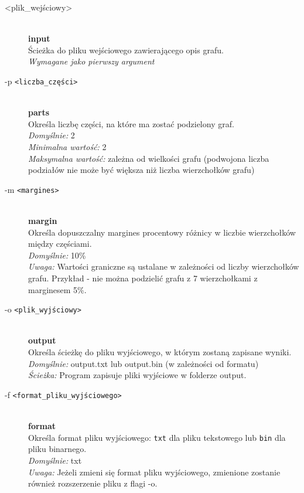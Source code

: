 \documentclass{article}
\begin{document}
\begin{description}
    \item[<plik\_wejściowy>] \hfill \\
    \textbf{input} \\
    Ścieżka do pliku wejściowego zawierającego opis grafu. \\
    \textit{Wymagane jako pierwszy argument}
    
    \item[-p \texttt{<liczba\_części>}] \hfill \\
    \textbf{parts} \\
    Określa liczbę części, na które ma zostać podzielony graf. \\
    \textit{Domyślnie:} 2 \\
    \textit{Minimalna wartość:} 2 \\ 
    \textit{Maksymalna wartość:} zależna od wielkości grafu (podwojona liczba podziałów nie może być większa niż liczba wierzchołków grafu)
    
    \item[-m \texttt{<margines>}] \hfill \\
    \textbf{margin} \\
    Określa dopuszczalny margines procentowy różnicy w liczbie wierzchołków między częściami. \\
    \textit{Domyślnie:} 10\% \\
    \textit{Uwaga: } Wartości graniczne są ustalane w zależności od liczby wierzchołków grafu. Przykład - nie można podzielić grafu z 7 wierzchołkami z marginesem 5\%.
    
    \item[-o \texttt{<plik\_wyjściowy>}] \hfill \\
    \textbf{output} \\
    Określa ścieżkę do pliku wyjściowego, w którym zostaną zapisane wyniki. \\
    \textit{Domyślnie:} output.txt lub output.bin (w zależności od formatu) \\
    \textit{Ścieżka:} Program zapisuje pliki wyjściowe w folderze output.
    
    \item[-f \texttt{<format\_pliku\_wyjściowego>}] \hfill \\
    \textbf{format} \\
    Określa format pliku wyjściowego: \texttt{txt} dla pliku tekstowego lub \texttt{bin} dla pliku binarnego. \\
    \textit{Domyślnie:} txt \\
    \textit{Uwaga:} Jeżeli zmieni się format pliku wyjściowego, zmienione zostanie również rozszerzenie pliku z flagi -o.
\end{description}
\end{document}
